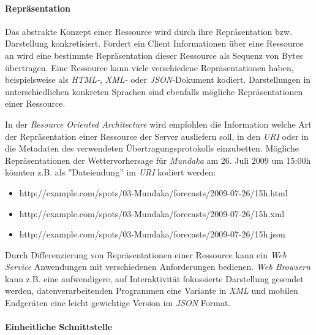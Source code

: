 \paragraph{Repräsentation}
Das abstrakte Konzept einer Ressource wird durch ihre Repräsentation
bzw. Darstellung konkretisiert. Fordert ein Client Informationen über
eine Ressource an wird eine bestimmte Repräsentation dieser Ressource
als Sequenz von Bytes übertragen. Eine Ressource kann viele
verschiedene Repräsentationen haben, beispielsweise als
\textit{HTML-}, 
\textit{XML-} oder \textit{JSON-}Dokument
 kodiert. Darstellungen
in unterschiedlichen konkreten Sprachen sind ebenfalls mögliche
Repräsentationen einer Ressource.

In der \textit{Resource Oriented Architecture} wird empfohlen die
Information welche Art der Repräsentation einer Ressource der Server
ausliefern soll, in den \textit{URI} oder in die Metadaten des
verwendeten Übertragungsprotokolls einzubetten. Mögliche
Repräsentationen der Wettervorhersage für \textit{Mundaka} am 26. Juli
2009 um 15:00h könnten z.B. als ''Dateiendung'' im \textit{URI}
kodiert werden:

{\sf \small
  \begin{itemize}
  \item http://example.com/spots/03-Mundaka/forecasts/2009-07-26/15h.html
  \item http://example.com/spots/03-Mundaka/forecasts/2009-07-26/15h.xml
  \item http://example.com/spots/03-Mundaka/forecasts/2009-07-26/15h.json
  \end{itemize}
}

Durch Differenzierung von Repräsentationen einer Ressource kann ein
\textit{Web Service} Anwendungen mit verschiedenen Anforderungen
bedienen. \textit{Web Browsern} kann z.B. eine aufwendigere, auf
Interaktivität fokussierte Darstellung gesendet werden,
datenverarbeitenden Programmen eine Variante in \textit{XML} und
mobilen Endgeräten eine leicht gewichtige Version im \textit{JSON}
Format.

\paragraph{Einheitliche Schnittstelle}

